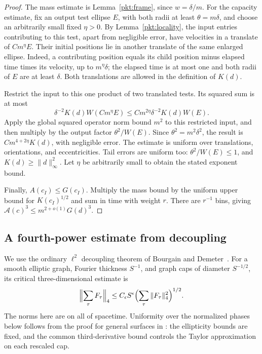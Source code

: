 \begin{proof}
The mass estimate is Lemma~\ref{pkt:frame}, since $w=\delta/m$.
For the capacity estimate, fix an output test ellipse $E$, with both
radii at least $\theta=m\delta$, and choose an arbitrarily small fixed
$\eta>0$.  By Lemma~\ref{pkt:locality}, the input entries contributing
to this test, apart from negligible error, have velocities in a
translate of $C m^\eta E$.  Their initial positions lie in another
translate of the same enlarged ellipse.  Indeed, a contributing
position equals its child position minus elapsed time times its
velocity, up to $m^\eta\delta$; the elapsed time is at most one and
both radii of $E$ are at least $\delta$.  Both translations are allowed
in the definition of $K(d)$.

Restrict the input to this one product of two translated tests.  Its
squared sum is at most
\[
 \delta^{-2}K(d)W(Cm^\eta E)
       \le C m^{2\eta}\delta^{-2}K(d)W(E).
\]
Apply the global squared operator norm bound $m^2$ to this restricted
input, and then multiply by the output factor $\theta^2/W(E)$.  Since
$\theta^2=m^2\delta^2$, the result is
$C m^{4+2\eta}K(d)$, with negligible error.  The estimate is uniform
over translations, orientations, and eccentricities.  Tail errors are
uniform too: $\theta^2/W(E)\le1$, and $K(d)\ge\|d\|_\infty^2$.
Let $\eta$ be arbitrarily small to obtain the stated exponent bound.

Finally, $A(c_I)\le G(c_I)$.  Multiply the mass bound by the uniform
upper bound for $K(c_I)^{1/2}$ and sum in time with weight $r$.
There are $r^{-1}$ bins, giving
$\mathcal A(c)^3\le m^{2+o(1)}G(d)^3$.
\end{proof}

\subsection{A fourth-power estimate from decoupling}

We use the ordinary \(\ell^2\) decoupling theorem of Bourgain and
Demeter~\cite[arXiv:1403.5335v3, Theorem~1.1, equation~(2)]{BourgainDemeter2015}.
For a smooth elliptic graph, Fourier thickness \(S^{-1}\), and graph
caps of diameter \(S^{-1/2}\), its critical three-dimensional estimate is
\[
 \Bigl\|\sum_\tau F_\tau\Bigr\|_4
 \le C_\epsilon S^\epsilon
          \Bigl(\sum_\tau\|F_\tau\|_4^2\Bigr)^{1/2}.
\]
The norms here are on all of spacetime. Uniformity over the normalized
phases below follows from the proof for general surfaces in
\cite[Section~7]{BourgainDemeter2015}: the ellipticity bounds are fixed,
and the common third-derivative bound controls the Taylor approximation
on each rescaled cap.

